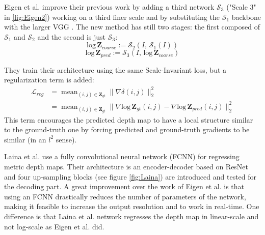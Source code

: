 Eigen et al. \cite{Eigen2} improve their previous work \cite{Eigen} by adding a third network $\mathcal{S}_{3}$ ("Scale 3" in \ref{fig:Eigen2}) working on a third finer scale and by substituting the $\mathcal{S}_{1}$ backbone with the larger VGG \cite{VGG}.
The new method has still two stages: the first composed of $\mathcal{S}_{1}$ and $\mathcal{S}_{2}$ and the second is just $\mathcal{S}_{3}$:
\[
	\text{log} \, \mathbf{Z}_{coarse} := \mathcal{S}_{2}(I, \, \mathcal{S}_{1}(I))
\]\[
	\text{log} \, \mathbf{Z}_{pred} := \mathcal{S}_{3}(I, \, \text{log} \, \mathbf{Z}_{coarse})
\]

They train their architecture using the same Scale-Invariant loss, but a regularization term is added:
\begin{equation}
\begin{split}
	\mathcal{L}_{reg} & = \mathop{\text{mean}}_{(i,j) \in \mathbf{Z}_{gt}}
		\big\|
			\nabla \delta(i,j)
		\big\|_{2}^{2} \\
	& = \mathop{\text{mean}}_{(i,j) \in \mathbf{Z}_{gt}}
		\big\|
			\nabla \text{log} \, \mathbf{Z}_{gt} (i,j) - \nabla \text{log} \, \mathbf{Z}_{pred} (i,j)
		\big\|_{2}^{2}
\end{split}
\end{equation}
This term encourages the predicted depth map to have a local structure similar to the ground-truth one by forcing predicted and ground-truth gradients to be similar (in an $l^{2}$ sense).

Laina et al. \cite{Laina} use a fully convolutional neural network (FCNN) for regressing metric depth maps.
Their architecture is an encoder-decoder based on ResNet \cite{ResNet} and four up-sampling blocks (see figure \ref{fig:Laina}) are introduced and tested for the decoding part.
A great improvement over the work of Eigen et al. is that using an FCNN drastically reduces the number of parameters of the network, making it feasible to increase the output resolution and to work in real-time.
One difference is that Laina et al. network regresses the depth map in linear-scale and not log-scale as Eigen et al. did.

